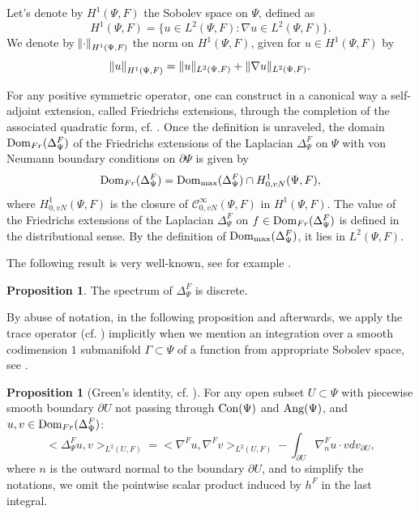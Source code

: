 \documentclass[12pt]{article}
\numberwithin{equation}{section}
\theoremstyle{theorem}
\theoremstyle{definition}
\newtheorem{prop}[thm]{Proposition}
\theoremstyle{remark}
\newcommand{\ccal}{\mathscr{C}}
\newcommand{\laplcomp}{\Delta}
\newcommand{\scal}[2]{\big< #1, #2 \big>}
\begin{document}
		\par 
	 	Let's denote by $H^1(\Psi, F)$ the Sobolev space on $\Psi$, defined as
	 	\begin{equation}
	 		H^1(\Psi, F) = \Big\{ u \in L^2(\Psi, F) : \nabla u \in L^2(\Psi, F)  \Big\}.
	 	\end{equation}
	 	We denote by $\norm{\cdot}_{H^1(\Psi, F)}$ the norm on $H^1(\Psi, F)$, given for $u \in H^1(\Psi, F)$ by
	 	\begin{equation}
	 		\norm{u}_{H^1(\Psi, F)} = \|  u \|_{L^2(\Psi, F)} +  \| \nabla u \|_{L^2(\Psi, F)}.
	 	\end{equation}
	 	\par 
	 	For any positive symmetric operator, one can construct in a canonical way a self-adjoint extension, called Friedrichs extensions, through the completion of the associated quadratic form, cf. \cite[Theorem X.23]{ReedSimonII}.
	 	Once the definition is unraveled, the domain ${\rm{Dom}}_{Fr}(\laplcomp_{\Psi}^{F})$ of the Friedrichs extensions of the Laplacian $\laplcomp_{\Psi}^{F}$ on $\Psi$ with von Neumann boundary conditions on $\partial \Psi$ is given by
	 	\begin{equation}\label{eq_dom_friedr}
	 		{\rm{Dom}}_{Fr}(\laplcomp_{\Psi}^{F}) = {\rm{Dom}}_{\max}(\laplcomp_{\Psi}^{F})  \cap H^{1}_{0, vN}(\Psi, F),
	 	\end{equation}
	 	where $H^{1}_{0, vN}(\Psi, F)$ is the closure of $\ccal^{\infty}_{0, vN}(\Psi, F)$ in $H^1(\Psi, F)$.
	 	The value of the Friedrichs extensions of the Laplacian $\laplcomp_{\Psi}^{F}$ on $f \in {\rm{Dom}}_{Fr}(\laplcomp_{\Psi}^{F})$ is defined in the distributional sense. By the definition of ${\rm{Dom}}_{\max}(\laplcomp_{\Psi}^{F})$, it lies in $L^2(\Psi, F)$.
	 	\par 
	 	The following result is very well-known, see for example \cite[Proposition 2.3]{FinFinDiffer}. 
	 	\begin{prop}\label{prop_spec_discr}
	 		The spectrum of $\laplcomp_{\Psi}^{F}$ is discrete.
	 	\end{prop}
		By abuse of notation, in the following proposition and afterwards, we apply the trace operator (cf. \cite[Theorem 1.5.1.1]{Grisvard}) implicitly when we mention an integration over a smooth codimension $1$ submanifold $\Gamma \subset \Psi$ of a function from appropriate Sobolev space, see \cite[(2.16)]{FinFinDiffer}.
		\begin{prop}[{Green's identity, cf. \cite[Proposition 2.4]{FinFinDiffer}}]\label{prop_green_identity}
			For any open subset $U \subset \Psi$ with piecewise smooth boundary $\partial U$ not passing through ${\rm{Con}}(\Psi)$ and ${\rm{Ang}}(\Psi)$, and $u, v \in {\rm{Dom}}_{Fr}(\laplcomp_{\Psi}^{F})$:
			\begin{equation}\label{eq_green_identity}
				\scal{\laplcomp_{\Psi}^{F} u}{v}_{L^2(U, F)} = \scal{\nabla^F u}{\nabla^F v}_{L^2(U, F)} - \int_{\partial U} \nabla_n^{F} u  \cdot v dv_{\partial U},
			\end{equation}
			where $n$ is the outward normal to the boundary $\partial U$, and to simplify the notations, we omit the pointwise scalar product induced by $h^F$ in the last integral.
		\end{prop}
\end{document}
